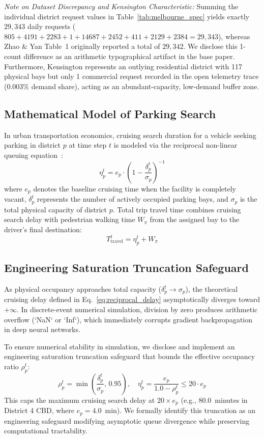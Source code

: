 \documentclass[journal]{IEEEtran}
\begin{document}
\textit{Note on Dataset Discrepancy and Kensington Characteristic:}
Summing the individual district request values in Table~\ref{tab:melbourne_spec} yields exactly $29,343$ daily requests ($805 + 4191 + 2283 + 1 + 14687 + 2452 + 411 + 2129 + 2384 = 29,343$), whereas Zhao \& Yan Table~1 originally reported a total of $29,342$. We disclose this 1-count difference as an arithmetic typographical artifact in the base paper. Furthermore, Kensington represents an outlying residential district with 117 physical bays but only 1 commercial request recorded in the open telemetry trace ($0.003\%$ demand share), acting as an abundant-capacity, low-demand buffer zone.

\subsection{Mathematical Model of Parking Search}
In urban transportation economics, cruising search duration for a vehicle seeking parking in district $p$ at time step $t$ is modeled via the reciprocal non-linear queuing equation~\cite{shoup2005high,arnott2006economic}:
\begin{equation}
\eta_p^t = e_p \cdot \left(1 - \frac{\delta_p^t}{\sigma_p}\right)^{-1}
\label{eq:reciprocal_delay}
\end{equation}
where $e_p$ denotes the baseline cruising time when the facility is completely vacant, $\delta_p^t$ represents the number of actively occupied parking bays, and $\sigma_p$ is the total physical capacity of district $p$. Total trip travel time combines cruising search delay with pedestrian walking time $W_{\pi}$ from the assigned bay to the driver's final destination:
\begin{equation}
T_{\text{travel}}^t = \eta_p^t + W_{\pi}
\label{eq:total_travel}
\end{equation}

\subsection{Engineering Saturation Truncation Safeguard}
As physical occupancy approaches total capacity ($\delta_p^t \to \sigma_p$), the theoretical cruising delay defined in Eq.~\eqref{eq:reciprocal_delay} asymptotically diverges toward $+\infty$. In discrete-event numerical simulation, division by zero produces arithmetic overflow (`NaN` or `Inf`), which immediately corrupts gradient backpropagation in deep neural networks. 

To ensure numerical stability in simulation, we disclose and implement an engineering saturation truncation safeguard that bounds the effective occupancy ratio $\rho_p^t$:
\begin{equation}
\rho_p^t = \min\left(\frac{\delta_p^t}{\sigma_p}, \, 0.95\right), \quad \eta_p^t = \frac{e_p}{1.0 - \rho_p^t} \le 20 \cdot e_p
\label{eq:saturation_cap}
\end{equation}
This caps the maximum cruising search delay at $20 \times e_p$ (e.g., 80.0~minutes in District 4 CBD, where $e_p = 4.0$~min). We formally identify this truncation as an engineering safeguard modifying asymptotic queue divergence while preserving computational tractability.
\end{document}

